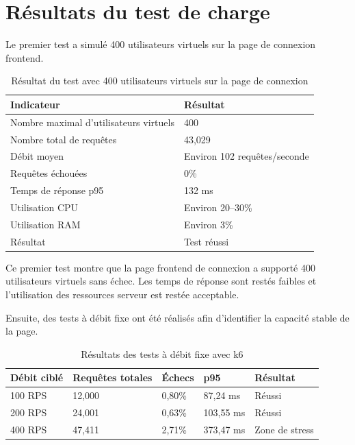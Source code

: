 \section{Résultats du test de charge}

Le premier test a simulé 400 utilisateurs virtuels sur la page de connexion frontend.

\begin{table}[H]
\centering
\small
\renewcommand{\arraystretch}{1.3}
\begin{tabular}{|p{6cm}|p{6cm}|}
\hline
\textbf{Indicateur} & \textbf{Résultat} \\
\hline
Nombre maximal d'utilisateurs virtuels & 400 \\
\hline
Nombre total de requêtes & 43,029 \\
\hline
Débit moyen & Environ 102 requêtes/seconde \\
\hline
Requêtes échouées & 0\% \\
\hline
Temps de réponse p95 & 132 ms \\
\hline
Utilisation CPU & Environ 20--30\% \\
\hline
Utilisation RAM & Environ 3\% \\
\hline
Résultat & Test réussi \\
\hline
\end{tabular}
\caption{Résultat du test avec 400 utilisateurs virtuels sur la page de connexion}
\label{tab:k6-vu-login}
\end{table}

Ce premier test montre que la page frontend de connexion a supporté 400 utilisateurs virtuels sans échec. Les temps de réponse sont restés faibles et l'utilisation des ressources serveur est restée acceptable.

Ensuite, des tests à débit fixe ont été réalisés afin d'identifier la capacité stable de la page.

\begin{table}[H]
\centering
\small
\renewcommand{\arraystretch}{1.3}
\begin{tabular}{|p{3cm}|p{3cm}|p{3cm}|p{3cm}|p{2cm}|}
\hline
\textbf{Débit ciblé} & \textbf{Requêtes totales} & \textbf{Échecs} & \textbf{p95} & \textbf{Résultat} \\
\hline
100 RPS & 12,000 & 0,80\% & 87,24 ms & Réussi \\
\hline
200 RPS & 24,001 & 0,63\% & 103,55 ms & Réussi \\
\hline
400 RPS & 47,411 & 2,71\% & 373,47 ms & Zone de stress \\
\hline
\end{tabular}
\caption{Résultats des tests à débit fixe avec k6}
\label{tab:k6-fixed-rate}
\end{table}

